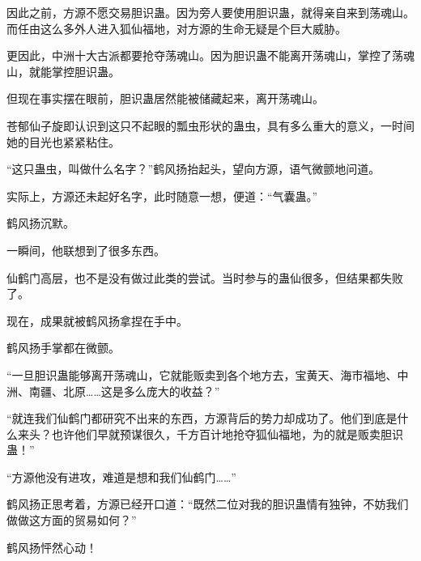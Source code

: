 \begin{this_body}
因此之前，方源不愿交易胆识蛊。因为旁人要使用胆识蛊，就得亲自来到荡魂山。而任由这么多外人进入狐仙福地，对方源的生命无疑是个巨大威胁。

更因此，中洲十大古派都要抢夺荡魂山。因为胆识蛊不能离开荡魂山，掌控了荡魂山，就能掌控胆识蛊。

但现在事实摆在眼前，胆识蛊居然能被储藏起来，离开荡魂山。

苍郁仙子旋即认识到这只不起眼的瓢虫形状的蛊虫，具有多么重大的意义，一时间她的目光也紧紧粘住。

“这只蛊虫，叫做什么名字？”鹤风扬抬起头，望向方源，语气微颤地问道。

实际上，方源还未起好名字，此时随意一想，便道：“气囊蛊。”

鹤风扬沉默。

一瞬间，他联想到了很多东西。

仙鹤门高层，也不是没有做过此类的尝试。当时参与的蛊仙很多，但结果都失败了。

现在，成果就被鹤风扬拿捏在手中。

鹤风扬手掌都在微颤。

“一旦胆识蛊能够离开荡魂山，它就能贩卖到各个地方去，宝黄天、海市福地、中洲、南疆、北原……这是多么庞大的收益？”

“就连我们仙鹤门都研究不出来的东西，方源背后的势力却成功了。他们到底是什么来头？也许他们早就预谋很久，千方百计地抢夺狐仙福地，为的就是贩卖胆识蛊！”

“方源他没有进攻，难道是想和我们仙鹤门……”

鹤风扬正思考着，方源已经开口道：“既然二位对我的胆识蛊情有独钟，不妨我们做做这方面的贸易如何？”

鹤风扬怦然心动！

\end{this_body}

